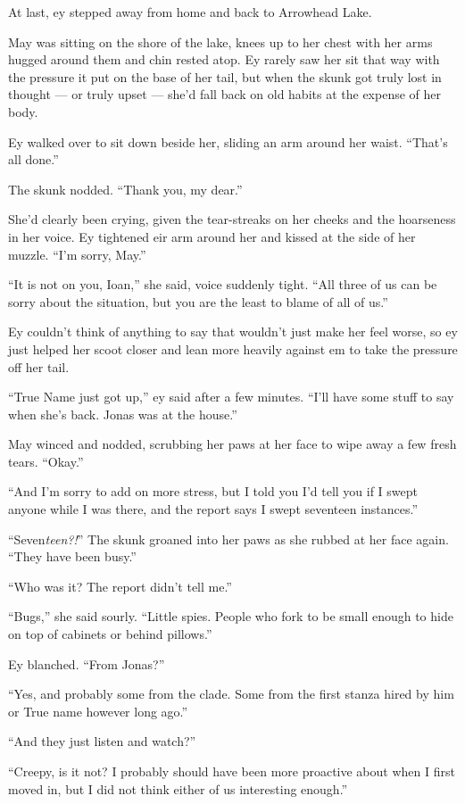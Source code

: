 At last, ey stepped away from home and back to Arrowhead Lake.

May was sitting on the shore of the lake, knees up to her chest with her arms hugged around them and chin rested atop. Ey rarely saw her sit that way with the pressure it put on the base of her tail, but when the skunk got truly lost in thought — or truly upset — she'd fall back on old habits at the expense of her body.

Ey walked over to sit down beside her, sliding an arm around her waist. ``That's all done.''

The skunk nodded. ``Thank you, my dear.''

She'd clearly been crying, given the tear-streaks on her cheeks and the hoarseness in her voice. Ey tightened eir arm around her and kissed at the side of her muzzle. ``I'm sorry, May.''

``It is not on you, Ioan,'' she said, voice suddenly tight. ``All three of us can be sorry about the situation, but you are the least to blame of all of us.''

Ey couldn't think of anything to say that wouldn't just make her feel worse, so ey just helped her scoot closer and lean more heavily against em to take the pressure off her tail.

``True Name just got up,'' ey said after a few minutes. ``I'll have some stuff to say when she's back. Jonas was at the house.''

May winced and nodded, scrubbing her paws at her face to wipe away a few fresh tears. ``Okay.''

``And I'm sorry to add on more stress, but I told you I'd tell you if I swept anyone while I was there, and the report says I swept seventeen instances.''

``Seven\emph{teen?!}'' The skunk groaned into her paws as she rubbed at her face again. ``They have been busy.''

``Who was it? The report didn't tell me.''

``Bugs,'' she said sourly. ``Little spies. People who fork to be small enough to hide on top of cabinets or behind pillows.''

Ey blanched. ``From Jonas?''

``Yes, and probably some from the clade. Some from the first stanza hired by him or True name however long ago.''

``And they just listen and watch?''

``Creepy, is it not? I probably should have been more proactive about when I first moved in, but I did not think either of us interesting enough.''

